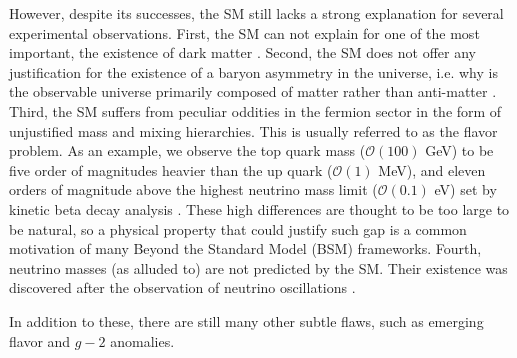 \documentclass[10pt]{book}
\renewcommand{\(}{\left(}
\renewcommand{\)}{\right)}
\renewcommand{\[}{\left[}
\renewcommand{\]}{\right]}
\begin{document}
However, despite its successes, the SM still lacks a strong explanation for several experimental observations. 
%
%
%
First, the SM can not explain for one of the most important, the existence of dark matter \cite{Bergstr_m_2000}. 
%
%
%
Second, the SM does not offer any justification for the existence of a baryon asymmetry in the universe, i.e. why is the observable universe primarily composed of matter rather than anti-matter \cite{book_Baryion}. 
%
%
Third, the SM suffers from peculiar oddities in the fermion sector in the form of unjustified mass and mixing hierarchies. 
%
This is usually referred to as the flavor problem. %
%
As an example, we observe the top quark mass ($\mathcal{O}(100)$ GeV) to be five order of magnitudes heavier than the up quark ($\mathcal{O}(1)$ MeV), and eleven orders of magnitude above the highest neutrino mass limit ($\mathcal{O}(0.1)$ eV) set by kinetic beta decay analysis \cite{Mertens_2016}.
%
%
These high differences are thought to be too large to be natural, so a physical property that could justify such gap is a common motivation of many Beyond the Standard Model (BSM) frameworks. 
%
Fourth, neutrino masses (as alluded to) are not predicted by the SM. 
%
Their existence was discovered after the observation of neutrino oscillations \cite{PhysRevD.89.013001}. 

In addition to these, there are still many other subtle flaws, such as emerging flavor and $g-2$ anomalies. 
%
%
\end{document}

